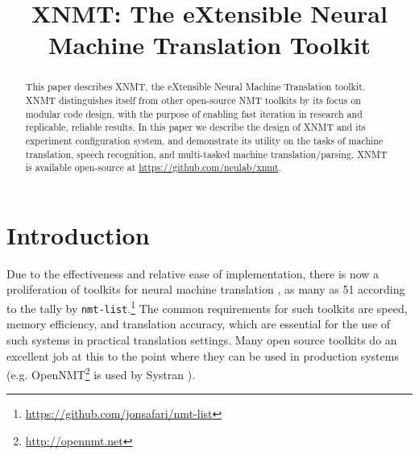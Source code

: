 \documentclass[]{article}
\begin{document}
\title{\bf XNMT: The eXtensible Neural Machine Translation Toolkit}  

\author{ \hfill 
\AND
        \hfill
\AND
        \hfill
\AND
        \hfill
\AND
        \hfill
\AND
        \hfill
\AND
        \hfill
\AND
        \hfill
}

\maketitle
\pagestyle{empty}

\begin{abstract}
This paper describes XNMT, the eXtensible Neural Machine Translation toolkit.
XNMT distinguishes itself from other open-source NMT toolkits by its focus on modular code design,
with the purpose of enabling fast iteration in research and replicable, reliable results.
In this paper we describe the design of XNMT and its experiment configuration system, and
demonstrate its utility on the tasks of machine translation, speech recognition, and multi-tasked machine translation/parsing.
XNMT is available open-source at \url{https://github.com/neulab/xnmt}.
\end{abstract}

\section{Introduction}
Due to the effectiveness and relative ease of implementation, there is now a proliferation of toolkits for neural machine translation \citep{Kalchbrenner2013,Sutskever2014,Bahdanau2014}, as many as 51 according to the tally by \texttt{nmt-list}.\footnote{\url{https://github.com/jonsafari/nmt-list}}
The common requirements for such toolkits are speed, memory efficiency, and translation accuracy, which are essential for the use of such systems in practical translation settings.
Many open source toolkits do an excellent job at this to the point where they can be used in production systems (e.g. OpenNMT\footnote{\url{http://opennmt.net}} is used by Systran \citep{crego2016systran}).
\end{document}
